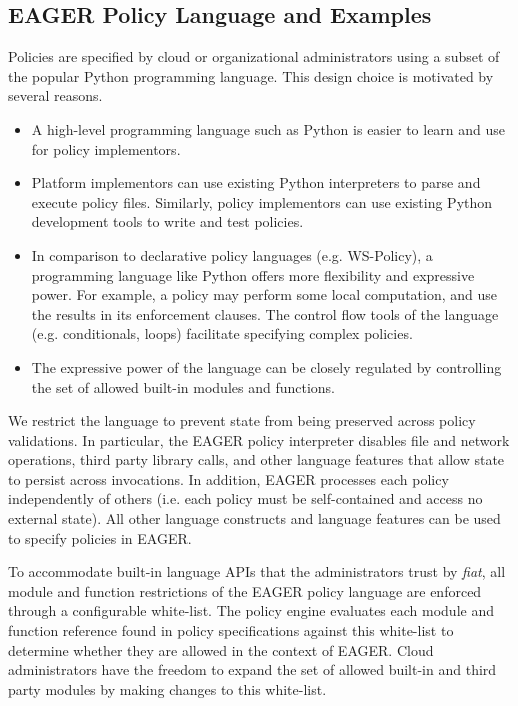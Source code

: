 \subsection{EAGER Policy Language and Examples}
\label{sec:policy-lang}
Policies are specified by cloud
or organizational administrators using a subset of the popular 
Python programming language.
This design choice is motivated by several reasons.
\begin{itemize}
\item A high-level programming language such as Python is easier to learn and use
for policy implementors. 
\item Platform implementors can use existing Python interpreters to parse
and execute policy files. Similarly, policy implementors can use existing Python
development tools to write and test policies.
\item In comparison to declarative policy languages (e.g. WS-Policy),
a programming language like Python offers more flexibility and expressive power.
For example, a policy may perform some local computation, and use the results
in its enforcement clauses. The control flow tools of the language (e.g. conditionals, loops) 
facilitate specifying complex policies.
\item The expressive power of the language can be closely regulated by controlling
the set of allowed built-in modules and functions.
\end{itemize}

We restrict the language to prevent state from being preserved across
policy validations. In particular, the EAGER policy interpreter disables 
file and network operations, third party library calls, 
and other language features that allow
state to persist across invocations.  
In addition, EAGER processes each 
policy independently of others (i.e. each policy must be self-contained and 
access no external state).  All other language constructs and 
language features can be used to specify policies in EAGER.

To accommodate built-in language APIs that the administrators trust by {\em fiat},
all module and function restrictions of the EAGER policy language are enforced
through a configurable white-list. The policy engine evaluates each module and function
reference found in policy specifications
against this white-list to determine whether they are allowed in the context of
EAGER. Cloud administrators have the freedom
to expand the set of allowed built-in and third party modules by making
changes to this white-list.

